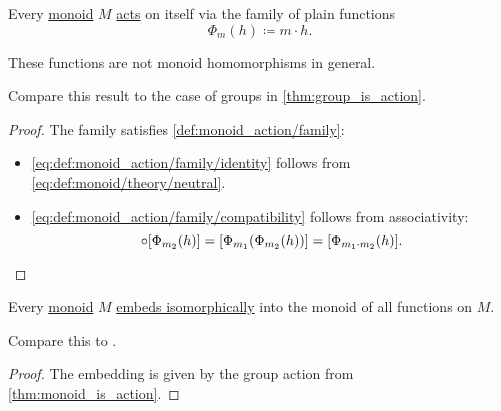 \begin{proposition}\label{thm:monoid_is_action}
  Every \hyperref[def:monoid]{monoid} \( M \) \hyperref[def:monoid_action]{acts} on itself via the family of plain functions
  \begin{equation*}
    \Phi_m(h) \coloneqq m \cdot h.
  \end{equation*}
\end{proposition}
\begin{comments}
  \item These functions are not monoid homomorphisms in general.
  \item Compare this result to the case of groups in \cref{thm:group_is_action}.
\end{comments}
\begin{proof}
  The family satisfies \cref{def:monoid_action/family}:
  \begin{itemize}
    \item \ref{eq:def:monoid_action/family/identity} follows from \eqref{eq:def:monoid/theory/neutral}.

    \item \ref{eq:def:monoid_action/family/compatibility} follows from associativity:
    \begin{equation*}
      [\Phi_{m_1}(h)] \bincirc [\Phi_{m_2}(h)] = [\Phi_{m_1}(\Phi_{m_2}(h))] = [\Phi_{m_1 \cdot m_2}(h)].
    \end{equation*}
  \end{itemize}
\end{proof}

\begin{theorem}\label{thm:cayleys_theorem_for_monoids}
  Every \hyperref[def:monoid]{monoid} \( M \) \hyperref[rem:embeds_isomorphically]{embeds isomorphically} into the monoid of all functions on \( M \).
\end{theorem}
\begin{comments}
  \item Compare this to .
\end{comments}
\begin{proof}
  The embedding is given by the group action from \cref{thm:monoid_is_action}.
\end{proof}

